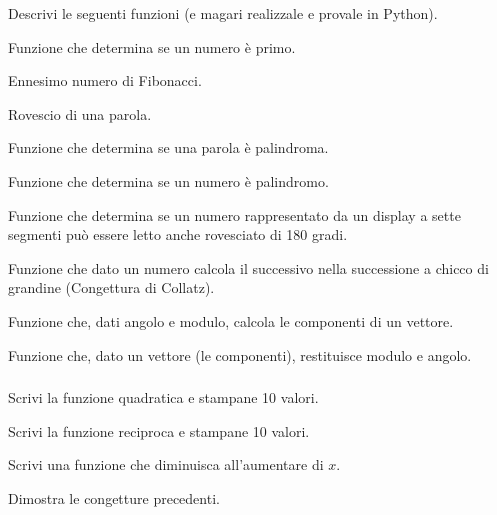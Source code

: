 \begin{esercizio}\label{ese:03.1}
Descrivi le seguenti funzioni (e magari realizzale e provale in Python).
 \begin{enumeratea}
\item Funzione che determina se un numero è primo.
\item Ennesimo numero di Fibonacci.
\item Rovescio di una parola.
\item Funzione che determina se una parola è palindroma.
\item Funzione che determina se un numero è palindromo.
\item Funzione che determina se un numero rappresentato da un display a 
sette segmenti può essere letto anche rovesciato di 180 gradi.
\item Funzione che dato un numero calcola il successivo nella successione a 
chicco di grandine (Congettura di Collatz).
\item Funzione che, dati angolo e modulo, calcola le componenti di un 
vettore.
\item Funzione che, dato un vettore (le componenti), restituisce modulo e 
angolo.
 \end{enumeratea}
\end{esercizio}

\subsubsection*{}

\begin{esercizio}
\label{ese:}
Scrivi la funzione quadratica e stampane 10 valori.
\end{esercizio}

\begin{esercizio}
\label{ese:}
Scrivi la funzione reciproca e stampane 10 valori.
\end{esercizio}

\begin{esercizio}
\label{ese:}
Scrivi una funzione che diminuisca all'aumentare di $x$.
\end{esercizio}

\begin{esercizio}
\label{ese:}
Dimostra le congetture precedenti.
\end{esercizio}

